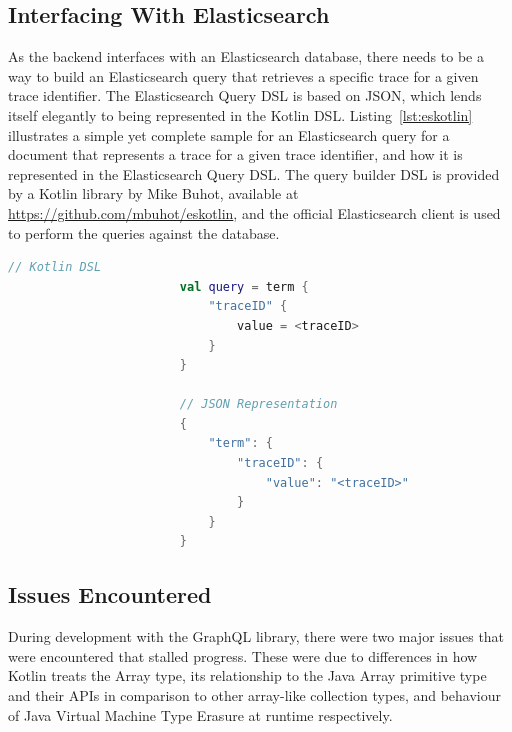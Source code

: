\documentclass[12pt,pdftex,titlepage]{report}
\begin{document}
            \subsection{Interfacing With Elasticsearch}
                As the backend interfaces with an Elasticsearch database, there needs to be a way to build an Elasticsearch query that retrieves a specific trace for a given trace identifier. The Elasticsearch Query DSL
                is based on JSON, which lends itself elegantly to being represented in the Kotlin DSL. Listing~\ref{lst:eskotlin} illustrates a simple yet complete sample for an Elasticsearch query for a document that
                represents a trace for a given trace identifier, and how it is represented in the Elasticsearch Query DSL. The query builder DSL is provided by a Kotlin library by Mike Buhot, available at 
                \url{https://github.com/mbuhot/eskotlin}, and the official Elasticsearch client is used to perform the queries against the database.

                \bigskip
                \begin{spacing}{1.0}
                    \begin{lstlisting}[caption={Comparison between Elasticsearch query using Kotlin DSL and the query in its JSON representation, where $\langle$traceID$\rangle$ refers
                        to a variable storing the trace identifier.}, label={lst:eskotlin}, language=Kotlin, gobble=24]
                        // Kotlin DSL
                        val query = term { 
                            "traceID" {
                                value = <traceID>
                            }
                        }

                        // JSON Representation
                        {
                            "term": {
                                "traceID": { 
                                    "value": "<traceID>" 
                                }
                            }
                        }
                    \end{lstlisting}
                \end{spacing}

            \subsection{Issues Encountered}
                During development with the GraphQL library, there were two major issues that were encountered that stalled progress. These were due to differences in how Kotlin treats the Array type, its
                relationship to the Java Array primitive type and their APIs in comparison to other array-like collection types, and behaviour of Java Virtual Machine Type Erasure\cite{typeerasure} at runtime respectively.
                
\end{document}

